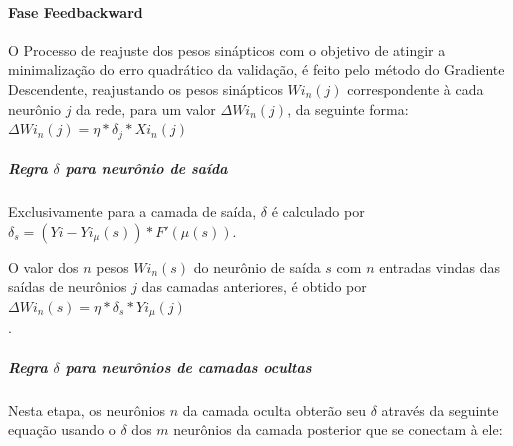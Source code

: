 \documentclass[	12pt, Times, openright, twoside, a4paper, english, brazil]{abntex2}
\begin{document}
            \paragraph*{Fase Feedbackward}
            O Processo de reajuste dos pesos sinápticos com o objetivo de atingir a minimalização do erro quadrático da validação, é feito pelo método do Gradiente Descendente, reajustando os pesos sinápticos $Wi_{n}(j)$ correspondente à cada neurônio $j$ da rede, para um valor $\Delta Wi_{n}(j)$, da seguinte forma:\\
            $\Delta Wi_{n}(j) = \eta*\delta_j*Xi_{n}(j)$\\
            
            \subparagraph*{Regra $\delta$ para neurônio de saída}
            Exclusivamente para a camada de saída, $\delta$ é calculado por\\
            $\delta_s = (Yi - Yi_{\mu}(s) )*F'(\mu(s))$.
            \begin{figure}[H]
           \end{figure}
            
            O valor dos $n$ pesos $Wi_{n}(s)$ do neurônio de saída $s$ com $n$ entradas vindas das saídas de neurônios $j$ das camadas anteriores, é obtido por $\Delta Wi_{n}(s) = \eta*\delta_s*Yi_{\mu}(j)$\\.
            \begin{figure}[H]
           \end{figure}
           \subparagraph*{Regra $\delta$ para neurônios de camadas ocultas}
            Nesta etapa, os neurônios $n$ da camada oculta obterão seu $\delta$ através da seguinte equação usando o $\delta$ dos $m$ neurônios da camada posterior que se conectam à ele:\\ 
            
\end{document}
